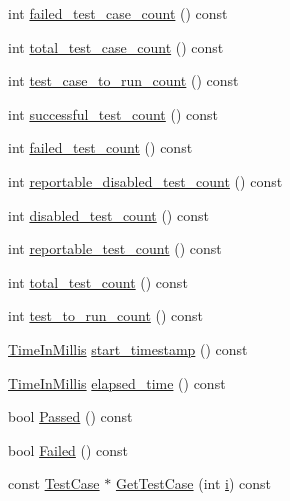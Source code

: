 \begin{DoxyCompactItemize}
\item 
int \mbox{\hyperlink{classtesting_1_1_unit_test_abc0fa297a4103f7cdd9627ae27d9d0ef}{failed\+\_\+test\+\_\+case\+\_\+count}} () const
\item 
int \mbox{\hyperlink{classtesting_1_1_unit_test_a93fc8f4eebc3212d06468ad216830ced}{total\+\_\+test\+\_\+case\+\_\+count}} () const
\item 
int \mbox{\hyperlink{classtesting_1_1_unit_test_a965248fbe72f9fede5de921b6666943b}{test\+\_\+case\+\_\+to\+\_\+run\+\_\+count}} () const
\item 
int \mbox{\hyperlink{classtesting_1_1_unit_test_a49ee8056e357ad497e67399447dd5a40}{successful\+\_\+test\+\_\+count}} () const
\item 
int \mbox{\hyperlink{classtesting_1_1_unit_test_ace1c860482b4ae5c341df5a9665e5c08}{failed\+\_\+test\+\_\+count}} () const
\item 
int \mbox{\hyperlink{classtesting_1_1_unit_test_a2a2835db178d5c8569507db9f0a3d54f}{reportable\+\_\+disabled\+\_\+test\+\_\+count}} () const
\item 
int \mbox{\hyperlink{classtesting_1_1_unit_test_ad69ccf3d4a9bc7333badeafbde3bc76b}{disabled\+\_\+test\+\_\+count}} () const
\item 
int \mbox{\hyperlink{classtesting_1_1_unit_test_a449d0e0350ef146040cd37679c005248}{reportable\+\_\+test\+\_\+count}} () const
\item 
int \mbox{\hyperlink{classtesting_1_1_unit_test_af6e02fcf76fd7247687f4e8af6e7ef41}{total\+\_\+test\+\_\+count}} () const
\item 
int \mbox{\hyperlink{classtesting_1_1_unit_test_a461f46b2976f135d2a65e8d3def746e9}{test\+\_\+to\+\_\+run\+\_\+count}} () const
\item 
\mbox{\hyperlink{namespacetesting_a992de1d091ce660f451d1e8b3ce30fd6}{Time\+In\+Millis}} \mbox{\hyperlink{classtesting_1_1_unit_test_ab6dc32e9f385f164df02899b2b440f04}{start\+\_\+timestamp}} () const
\item 
\mbox{\hyperlink{namespacetesting_a992de1d091ce660f451d1e8b3ce30fd6}{Time\+In\+Millis}} \mbox{\hyperlink{classtesting_1_1_unit_test_a410e14e52f505dabe2054e5018e9ca33}{elapsed\+\_\+time}} () const
\item 
bool \mbox{\hyperlink{classtesting_1_1_unit_test_a7c9b327bc14cb8a282c789dc6513a55b}{Passed}} () const
\item 
bool \mbox{\hyperlink{classtesting_1_1_unit_test_a706f29e765916616b11a271a65948727}{Failed}} () const
\item 
const \mbox{\hyperlink{classtesting_1_1_test_case}{Test\+Case}} $\ast$ \mbox{\hyperlink{classtesting_1_1_unit_test_adf55eb1cc81a43d40ddef75fadded1de}{Get\+Test\+Case}} (int \mbox{\hyperlink{_obj__test_2lib_2googletest-master_2googlemock_2test_2gmock-matchers__test_8cc_acb559820d9ca11295b4500f179ef6392}{i}}) const

\end{DoxyCompactItemize}
